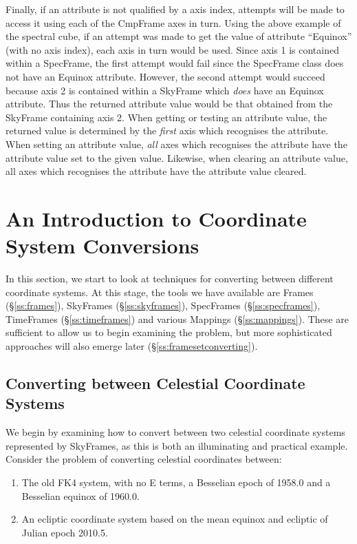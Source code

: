 \documentclass[twoside,11pt]{article}
\newcommand{\secref}[1]{\S\ref{#1}}
\newcommand{\secref}[1]{\ref{#1}}
\begin{document}
Finally, if an attribute is not qualified by a axis index, attempts will
be made to access it using each of the CmpFrame axes in turn. Using the
above example of the spectral cube, if an attempt was made to get the
value of attribute ``Equinox'' (with no axis index), each axis in turn
would be used. Since axis 1 is contained within a SpecFrame, the first
attempt would fail since the SpecFrame class does not have an Equinox
attribute. However, the second attempt would succeed because axis 2 is
contained within a SkyFrame which \emph{does} have an Equinox attribute. Thus
the returned attribute value would be that obtained from the SkyFrame
containing axis 2. When getting or testing an attribute value, the
returned value is determined by the \emph{first} axis which recognises
the attribute. When setting an attribute value, \emph{all} axes
which recognises the attribute have the attribute value set to the given
value. Likewise, when clearing an attribute value, all axes
which recognises the attribute have the attribute value cleared.

\cleardoublepage
\section{\label{ss:introducingconversion}An Introduction to Coordinate System Conversions}

In this section, we start to look at techniques for converting between
different coordinate systems.  At this stage, the tools we have available
are Frames (\secref{ss:frames}), SkyFrames (\secref{ss:skyframes}),
SpecFrames (\secref{ss:specframes}), TimeFrames (\secref{ss:timeframes}) and
various Mappings (\secref{ss:mappings}). These are sufficient to allow us to
begin examining the problem, but more sophisticated approaches will also emerge
later (\secref{ss:framesetconverting}).

\subsection{\label{ss:convertingskyframes}Converting between Celestial Coordinate Systems}

We begin by examining how to convert between two celestial coordinate
systems represented by SkyFrames, as this is both an illuminating and
practical example.  Consider the problem of converting celestial
coordinates between:

\begin{enumerate}
\item The old FK4 system, with no E terms, a Besselian epoch of
1958.0 and a Besselian equinox of 1960.0.

\item An ecliptic coordinate system based on the mean equinox and
ecliptic of Julian epoch 2010.5.
\end{enumerate}
\end{document}
